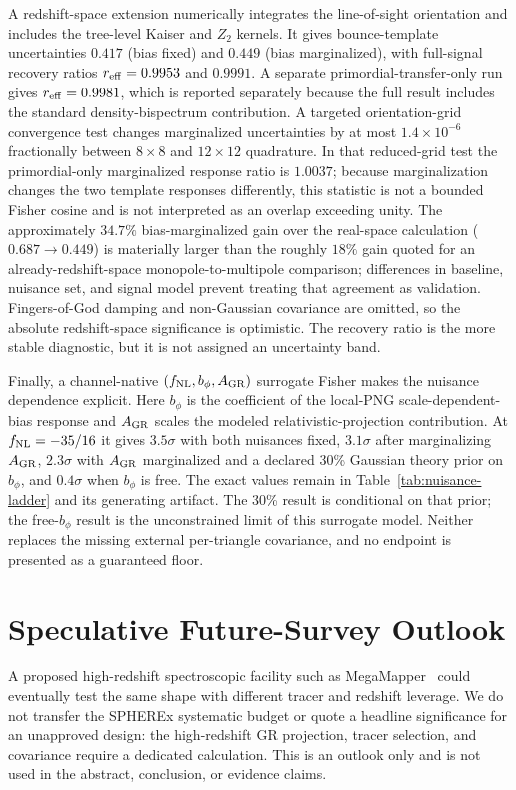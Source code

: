 \documentclass[aps,prd,twocolumn,superscriptaddress,showpacs,preprintnumbers,nofootinbib,longbibliography,floatfix]{revtex4-2}
\newcommand{\fnl}{f_{\rm NL}}
\begin{document}
A redshift-space extension numerically integrates the line-of-sight orientation and includes the tree-level Kaiser and $Z_2$ kernels. It gives bounce-template uncertainties $0.417$ (bias fixed) and $0.449$ (bias marginalized), with full-signal recovery ratios $r_{\rm eff}=0.9953$ and $0.9991$. A separate primordial-transfer-only run gives $r_{\rm eff}=0.9981$, which is reported separately because the full result includes the standard density-bispectrum contribution. A targeted orientation-grid convergence test changes marginalized uncertainties by at most $1.4\times10^{-6}$ fractionally between $8\times8$ and $12\times12$ quadrature. In that reduced-grid test the primordial-only marginalized response ratio is $1.0037$; because marginalization changes the two template responses differently, this statistic is not a bounded Fisher cosine and is not interpreted as an overlap exceeding unity. The approximately $34.7\%$ bias-marginalized gain over the real-space calculation ($0.687\to0.449$) is materially larger than the roughly $18\%$ gain quoted for an already-redshift-space monopole-to-multipole comparison; differences in baseline, nuisance set, and signal model prevent treating that agreement as validation. Fingers-of-God damping and non-Gaussian covariance are omitted, so the absolute redshift-space significance is optimistic. The recovery ratio is the more stable diagnostic, but it is not assigned an uncertainty band.

Finally, a channel-native $(\fnl,b_\phi,A_{\rm GR})$ surrogate Fisher makes the nuisance dependence explicit. Here $b_\phi$ is the coefficient of the local-PNG scale-dependent-bias response and $A_{\rm GR}$ scales the modeled relativistic-projection contribution. At $\fnl=-35/16$ it gives $3.5\sigma$ with both nuisances fixed, $3.1\sigma$ after marginalizing $A_{\rm GR}$, $2.3\sigma$ with $A_{\rm GR}$ marginalized and a declared 30\% Gaussian theory prior on $b_\phi$, and $0.4\sigma$ when $b_\phi$ is free. The exact values remain in Table~\ref{tab:nuisance-ladder} and its generating artifact. The 30\% result is conditional on that prior; the free-$b_\phi$ result is the unconstrained limit of this surrogate model. Neither replaces the missing external per-triangle covariance, and no endpoint is presented as a guaranteed floor.
\section{Speculative Future-Survey Outlook}
\label{sec:megamapper}

A proposed high-redshift spectroscopic facility such as MegaMapper~\cite{Schlegel:2022} could eventually test the same shape with different tracer and redshift leverage. We do not transfer the SPHEREx systematic budget or quote a headline significance for an unapproved design: the high-redshift GR projection, tracer selection, and covariance require a dedicated calculation. This is an outlook only and is not used in the abstract, conclusion, or evidence claims.
\end{document}
